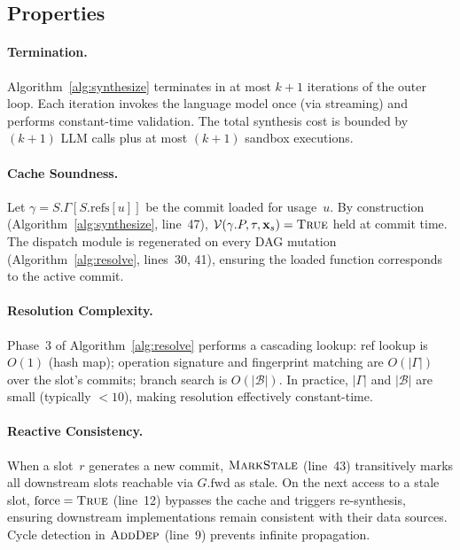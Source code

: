 
\subsection{Properties}
\label{sec:properties}

\paragraph{Termination.}
Algorithm~\ref{alg:synthesize} terminates in at most $k{+}1$ iterations of the
outer loop.  Each iteration invokes the language model once (via streaming) and
performs constant-time validation.  The total synthesis cost is bounded by
$(k{+}1)$ LLM calls plus at most $(k{+}1)$ sandbox executions.

\paragraph{Cache Soundness.}
Let $\gamma = S.\Gamma[S.\mathrm{refs}[u]]$ be the commit loaded for usage~$u$.
By construction (Algorithm~\ref{alg:synthesize}, line~47),
$\mathcal{V}(\gamma.P, \tau, \mathbf{x}_s) = \textsc{True}$ held at commit
time.  The dispatch module is regenerated on every DAG mutation
(Algorithm~\ref{alg:resolve}, lines~30, 41), ensuring the loaded function
corresponds to the active commit.

\paragraph{Resolution Complexity.}
Phase~3 of Algorithm~\ref{alg:resolve} performs a cascading lookup:
ref lookup is $O(1)$ (hash map); operation signature and fingerprint matching
are $O(|\Gamma|)$ over the slot's commits; branch search is $O(|\mathcal{B}|)$.
In practice, $|\Gamma|$ and $|\mathcal{B}|$ are small (typically $< 10$),
making resolution effectively constant-time.

\paragraph{Reactive Consistency.}
When a slot~$r$ generates a new commit, $\textsc{MarkStale}$ (line~43)
transitively marks all downstream slots reachable via $G.\mathrm{fwd}$ as
stale.  On the next access to a stale slot, $\mathrm{force} = \textsc{True}$
(line~12) bypasses the cache and triggers re-synthesis, ensuring downstream
implementations remain consistent with their data sources.  Cycle detection in
$\textsc{AddDep}$ (line~9) prevents infinite propagation.

